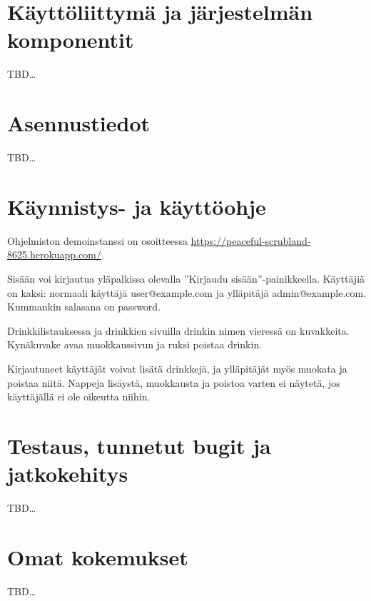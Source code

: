 \documentclass[a4paper]{article}
\begin{document}
\section{Käyttöliittymä ja järjestelmän komponentit}
TBD\ldots{}

\section{Asennustiedot}
TBD\ldots{}

\section{Käynnistys- ja käyttöohje}
Ohjelmiston demoinstanssi on osoitteessa \url{https://peaceful-scrubland-8625.herokuapp.com/}.

Sisään voi kirjautua yläpalkissa olevalla ''Kirjaudu sisään''-painikkeella. Käyttäjiä on kaksi: normaali käyttäjä user@example.com ja ylläpitäjä admin@example.com. Kummankin salasana on password.

Drinkkilistauksessa ja drinkkien sivuilla drinkin nimen vieressä on kuvakkeita. Kynäkuvake avaa muokkaussivun ja ruksi poistaa drinkin.

Kirjautuneet käyttäjät voivat lisätä drinkkejä, ja ylläpitäjät myös muokata ja poistaa niitä. Nappeja lisäystä, muokkausta ja poistoa varten ei näytetä, jos käyttäjällä ei ole oikeutta niihin.

\section{Testaus, tunnetut bugit ja jatkokehitys}
TBD\ldots{}

\section{Omat kokemukset}
TBD\ldots{}
\end{document}
